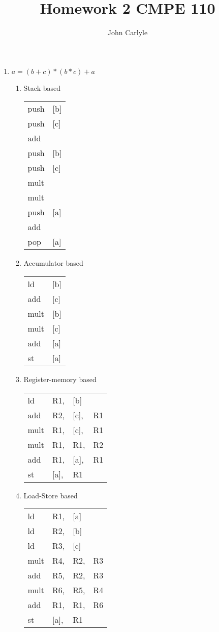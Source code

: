 \documentclass{article}
\title{Homework 2 CMPE 110}
\author{John Carlyle}
\begin{document}
\maketitle

\begin{enumerate}
\item
  $a = (b+c)*(b*c) + a$
  \setlength{\tabcolsep}{2pt}

  \begin{enumerate}
    \item Stack based
      
      \begin{tabular}{ll}
        push & [b]\\
        push&[c]\\
        add&\\
        push&[b]\\
        push&[c]\\
        mult&\\
        mult&\\
        push&[a]\\
        add&\\
        pop&[a]
      \end{tabular}
      
    \item Accumulator based \hfill\\
      \begin{tabular}{ll}
        ld&[b]\\
        add&[c]\\
        mult&[b]\\
        mult&[c]\\
        add&[a]\\
        st&[a]
      \end{tabular}

    \item Register-memory based \hfill\\
      \begin{tabular}{llll}
        ld&R1,&[b]\\
        add&R2,&[c],&R1\\
        mult&R1,&[c],&R1\\
        mult&R1,&R1,&R2\\
        add&R1,&[a],&R1\\
        st&[a],&R1
      \end{tabular}

    \item Load-Store based \hfill\\
      \begin{tabular}{llll}
        ld &R1,&[a]\\
        ld &R2, &[b]\\
        ld &R3, &[c]\\
        mult&R4,&R2,&R3\\
        add&R5,&R2,&R3\\
        mult&R6,&R5,&R4\\
        add&R1,&R1,&R6\\
        st&[a],&R1
      \end{tabular}
    \end{enumerate}


\end{enumerate}
\end{document}
